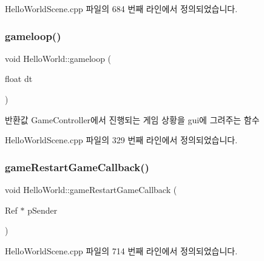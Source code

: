Hello\+World\+Scene.\+cpp 파일의 684 번째 라인에서 정의되었습니다.

\mbox{\label{class_hello_world_af59f38fb445c1302e5d2f7e18d0ab0e5}} 
\subsubsection{\texorpdfstring{gameloop()}{gameloop()}}
{\footnotesize\ttfamily void Hello\+World\+::gameloop (\begin{DoxyParamCaption}\item[{float}]{dt }\end{DoxyParamCaption})\hspace{0.3cm}{\ttfamily [protected]}}

\begin{DoxyReturn}{반환값}
Game\+Controller에서 진행되는 게임 상황을 gui에 그려주는 함수 
\end{DoxyReturn}


Hello\+World\+Scene.\+cpp 파일의 329 번째 라인에서 정의되었습니다.

\mbox{\label{class_hello_world_a73ad0d041144a1e610534fe5df41d556}} 
\subsubsection{\texorpdfstring{game\+Restart\+Game\+Callback()}{gameRestartGameCallback()}}
{\footnotesize\ttfamily void Hello\+World\+::game\+Restart\+Game\+Callback (\begin{DoxyParamCaption}\item[{Ref $\ast$}]{p\+Sender }\end{DoxyParamCaption})}



Hello\+World\+Scene.\+cpp 파일의 714 번째 라인에서 정의되었습니다.

\mbox{\label{class_hello_world_a7b22f04ccc721e47e59c4f5470768790}} 
